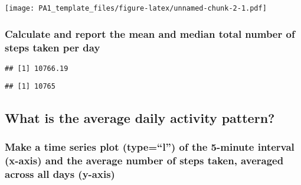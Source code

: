 \documentclass[]{article}
\newenvironment{Shaded}{\begin{snugshade}}{\end{snugshade}}
\newcommand{\KeywordTok}[1]{\textcolor[rgb]{0.13,0.29,0.53}{\textbf{#1}}}
\newcommand{\CommentTok}[1]{\textcolor[rgb]{0.56,0.35,0.01}{\textit{#1}}}
\newcommand{\OperatorTok}[1]{\textcolor[rgb]{0.81,0.36,0.00}{\textbf{#1}}}
\newcommand{\NormalTok}[1]{#1}
\begin{document}
\texttt{[image: PA1\_template\_files/figure-latex/unnamed-chunk-2-1.pdf]}

\subsubsection{Calculate and report the mean and median total number of
steps taken per
day}\label{calculate-and-report-the-mean-and-median-total-number-of-steps-taken-per-day}

\begin{Shaded}
\end{Shaded}

\begin{verbatim}
## [1] 10766.19
\end{verbatim}

\begin{Shaded}
\end{Shaded}

\begin{verbatim}
## [1] 10765
\end{verbatim}

\subsection{What is the average daily activity
pattern?}\label{what-is-the-average-daily-activity-pattern}

\subsubsection{\texorpdfstring{Make a time series plot (type=``l'') of
the 5-minute interval (x-axis) and the average number of steps taken,
averaged across all days
(y-axis)}{Make a time series plot (type=l) of the 5-minute interval (x-axis) and the average number of steps taken, averaged across all days (y-axis)}}\label{make-a-time-series-plot-typel-of-the-5-minute-interval-x-axis-and-the-average-number-of-steps-taken-averaged-across-all-days-y-axis}
\end{document}
